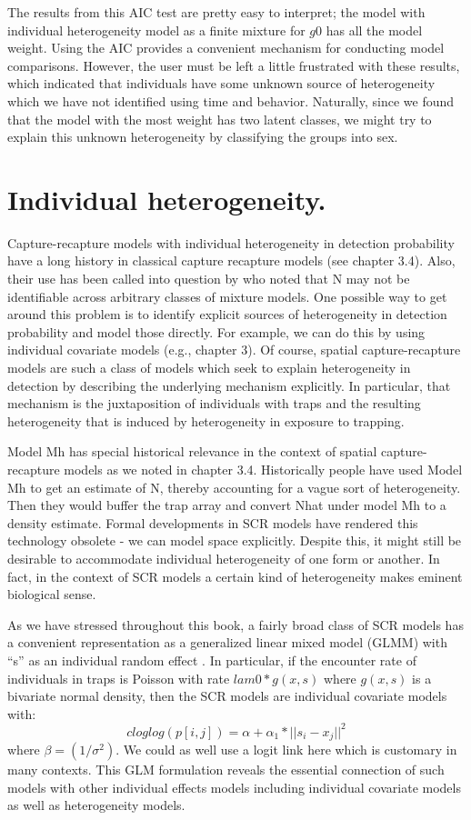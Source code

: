 The results from this AIC test are pretty easy to interpret; the model
with individual heterogeneity model as a finite mixture for $g0$ has all
the model weight.  Using the AIC provides a convenient mechanism for
conducting model comparisons.  However, the user must be left a little
frustrated with these results, which indicated that individuals have
some unknown source of heterogeneity which we have not identified
using time and behavior.  Naturally, since we found that the model
with the most weight has two latent classes, we might try to explain
this unknown heterogeneity by classifying the groups into sex. 

\section{Individual heterogeneity.}

Capture-recapture models with individual heterogeneity in detection probability have a long history in classical capture recapture models (see chapter 3.4). Also, their use has been called into question by \citet{link:2003} who noted that N may not be identifiable across arbitrary classes of mixture models.   One possible way to get around this problem is to identify explicit sources of heterogeneity in detection probability and model those directly. For example, we can do this by using individual covariate models (e.g., chapter 3).  Of course, spatial capture-recapture models are such a class of models which seek to explain heterogeneity in detection by describing the underlying mechanism explicitly. In particular, that mechanism is  the juxtaposition of individuals with traps and the resulting heterogeneity that is induced by heterogeneity in exposure to trapping.

Model Mh has special historical relevance in the context of spatial capture-recapture models as we noted in chapter 3.4. Historically people have used Model Mh to get an estimate of N, thereby accounting for a vague sort of heterogeneity. Then they would buffer the trap array and convert Nhat under model Mh to a density estimate.   Formal developments in SCR models have rendered this technology obsolete - we can model space explicitly.  Despite this, it might still be desirable to accommodate individual heterogeneity of one form or another. In fact, in the context of SCR models a certain kind of heterogeneity makes eminent biological sense. 

As we have stressed throughout this book, a fairly broad class of SCR models has a convenient representation as a generalized linear mixed model (GLMM) with ``s'' as an individual random effect \citep{royle_etal:2009}.  In particular, if the encounter rate of individuals in traps is Poisson with rate $lam0*g(x,s)$ where $g(x,s)$ is a bivariate normal density, then the SCR models are individual covariate models with:
\[  
 cloglog(p[i,j]) = \alpha + \alpha_1*||s_{i} - x_{j}||^2 
\]
where $\beta = (1/\sigma^{2})$.  We could as well use a logit link here which is customary in many contexts.  This GLM formulation reveals the essential connection of such models with other individual effects models including individual covariate models as well as heterogeneity models.

